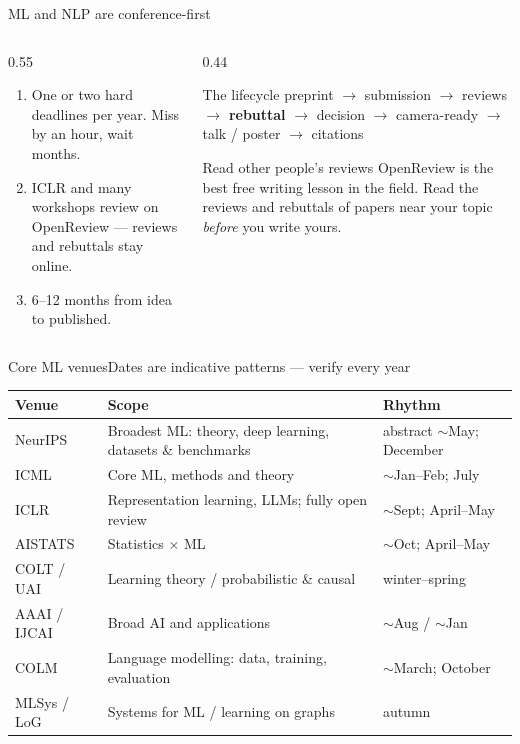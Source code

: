 \documentclass[aspectratio=169,11pt]{beamer}
\begin{document}
\begin{frame}{ML and NLP are conference-first}
\begin{columns}[T]
\begin{column}{0.55\textwidth}
\begin{enumerate}
  \item {} One or two hard deadlines per
        year. Miss by an hour, wait months.
  \item {} ICLR and many workshops review on
        OpenReview --- reviews and rebuttals stay online.
  \item {} 6--12 months from idea to published.
\end{enumerate}
\end{column}
\begin{column}{0.44\textwidth}
\begin{block}{The lifecycle}
\footnotesize
preprint $\rightarrow$ submission $\rightarrow$ reviews $\rightarrow$
\textbf{rebuttal} $\rightarrow$ decision $\rightarrow$ camera-ready
$\rightarrow$ talk / poster $\rightarrow$ citations
\end{block}
\begin{alertblock}{Read other people's reviews}
\footnotesize
OpenReview is the best free writing lesson in the field. Read the reviews and
rebuttals of papers near your topic \emph{before} you write yours.
\end{alertblock}
\end{column}
\end{columns}
\end{frame}

\begin{frame}{Core ML venues}{Dates are indicative patterns --- verify every year}
\footnotesize
\begin{tabularx}{\textwidth}{>{\raggedright\arraybackslash}p{2.1cm} X >{\raggedright\arraybackslash}p{3.5cm}}
\toprule
\textbf{\color{brand}Venue} & \textbf{\color{brand}Scope} & \textbf{\color{brand}Rhythm} \\
\midrule
\rowcolor{rowtint}
NeurIPS & Broadest ML: theory, deep learning, datasets \& benchmarks & abstract $\sim$May; December \\
ICML & Core ML, methods and theory & $\sim$Jan--Feb; July \\
\rowcolor{rowtint}
ICLR & Representation learning, LLMs; fully open review & $\sim$Sept; April--May \\
AISTATS & Statistics $\times$ ML & $\sim$Oct; April--May \\
\rowcolor{rowtint}
COLT / UAI & Learning theory / probabilistic \& causal & winter--spring \\
AAAI / IJCAI & Broad AI and applications & $\sim$Aug / $\sim$Jan \\
\rowcolor{rowtint}
COLM & Language modelling: data, training, evaluation & $\sim$March; October \\
MLSys / LoG & Systems for ML / learning on graphs & autumn \\
\bottomrule
\end{tabularx}
\end{frame}
\end{document}
